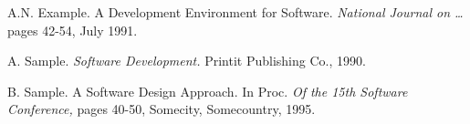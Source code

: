 \documentclass{casconpaper}
\begin{document}
{\begin{thebibliography}{9}

    A.N. Example. A Development Environment for Software. 
    \emph{National Journal on \dots } 
    pages 42-54, July 1991.
    
	A. Sample. 
    \emph{Software Development. }
    Printit Publishing Co., 1990.

    B. Sample. 
    A Software Design Approach. In Proc. 
    \emph{Of the 15th Software Conference, }
    pages 40-50, Somecity, Somecountry, 1995.
    
\end{thebibliography}
} %
\end{document}
